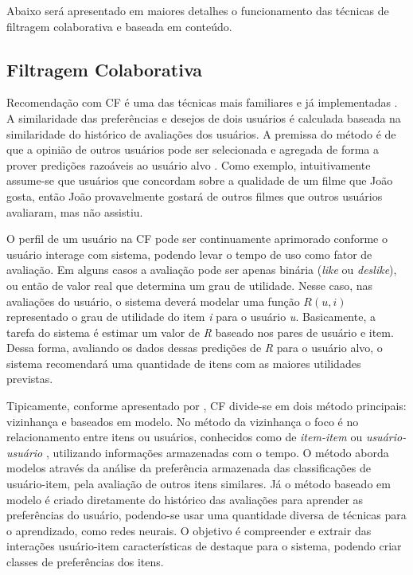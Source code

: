 Abaixo será apresentado em maiores detalhes o funcionamento das técnicas de filtragem colaborativa e baseada em conteúdo.

\subsection{Filtragem Colaborativa}

Recomendação com \ac{CF} é uma das técnicas mais familiares e já implementadas \citep{Ricci2011}. A similaridade das preferências e desejos de dois usuários é calculada baseada na similaridade do histórico de avaliações dos usuários. A premissa do método é de que a opinião de outros usuários pode ser selecionada e agregada de forma a prover predições razoáveis ao usuário alvo \citep{HCI-009}. Como exemplo, intuitivamente assume-se que usuários que concordam sobre a qualidade de um filme que João gosta, então João provavelmente gostará de outros filmes que outros usuários avaliaram, mas não assistiu.

O perfil de um usuário na CF pode ser continuamente aprimorado conforme o usuário interage com sistema, podendo levar o tempo de uso como fator de avaliação. Em alguns casos a avaliação pode ser apenas binária (\textit{like} ou \textit{deslike}), ou então de valor real que determina um grau de utilidade. Nesse caso, nas avaliações do usuário, o sistema deverá modelar uma função $R(u,i)$ representado o grau de utilidade do item \textit{i} para o usuário \textit{u}.  Basicamente, a tarefa do sistema é estimar um valor de \textit{R} baseado nos pares de usuário e item. Dessa forma, avaliando os dados dessas predições de \textit{R} para o usuário alvo, o sistema recomendará uma quantidade de itens com as maiores utilidades previstas.

Tipicamente, conforme apresentado por \cite{Burke:2002:HRS:586321.586352}, CF divide-se em dois método principais: vizinhança e baseados em modelo. No método da vizinhança o foco é no relacionamento entre itens ou usuários, conhecidos como de \textit{item-item} ou \textit{usuário-usuário} \citep{Ricci2011}, utilizando informações armazenadas com o tempo. O método aborda modelos através da análise da preferência armazenada das classificações de usuário-item, pela avaliação de outros itens similares. Já o método baseado em modelo é criado diretamente do histórico das avaliações para aprender as preferências do usuário, podendo-se usar uma quantidade diversa de técnicas para o aprendizado, como redes neurais. O objetivo é compreender e extrair das interações usuário-item características de destaque para o sistema, podendo criar classes de preferências dos itens.

